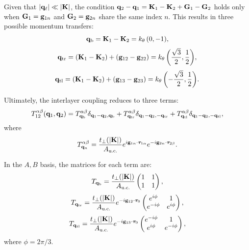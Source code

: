 Given that \( \abs{{\vb{q}}_\ell} \ll \abs{{\vb{K}}} \), the condition \( {\vb{q}}_2 - {\vb{q}}_1 = {\vb{K}}_1 - {\vb{K}}_2 + {\vb{G}}_1 - {\vb{G}}_2 \) holds only when \( {\vb{G}}_1 = {\vb{g}}_{1n} \) and \( {\vb{G}}_2 = {\vb{g}}_{2n} \) share the same index \( n \). This results in three possible momentum transfers:
\begin{equation} \label{eq:qb}
{\vb{q}}_\text{b} = {\vb{K}}_1 - {\vb{K}}_2 = k_\theta \, (0, -1),
\end{equation}
\begin{equation} \label{eq:qtr}
{\vb{q}}_\text{tr} = ({\vb{K}}_1 - {\vb{K}}_2) + ({\vb{g}}_{12} - {\vb{g}}_{22}) = k_\theta \, \qty(\frac{\sqrt{3}}{2}, \frac{1}{2}),
\end{equation}
\begin{equation} \label{eq:qtl}
{\vb{q}}_\text{tl} = ({\vb{K}}_1 - {\vb{K}}_2) + ({\vb{g}}_{13} - {\vb{g}}_{23}) = k_\theta \, \qty(-\frac{\sqrt{3}}{2}, \frac{1}{2}).
\end{equation}

Ultimately, the interlayer coupling reduces to three terms:
\begin{equation} \label{eq:interlayer-3terms}
T_{12}^{\alpha\beta}({\vb{q}}_1, {\vb{q}}_2) = T^{\alpha\beta}_{{\vb{q}}_\text{b}} \delta_{{\vb{q}}_1 - {\vb{q}}_2, {\vb{q}}_\text{b}}
+ T^{\alpha\beta}_{{\vb{q}}_\text{tr}} \delta_{{\vb{q}}_1 - {\vb{q}}_2, -{\vb{q}}_\text{tr}}
+ T^{\alpha\beta}_{{\vb{q}}_\text{tl}} \delta_{{\vb{q}}_1 - {\vb{q}}_2, -{\vb{q}}_\text{tl}},
\end{equation}
where
\begin{equation} \label{eq:interlayer-tensor}
T^{\alpha\beta}_{{\vb{q}}_n} = \frac{t_\perp(\abs{{\vb{K}}})}{A_{\text{u.c.}}} e^{i {\vb{g}}_{1n} \cdot \bm{\tau}_{1\alpha}}
e^{-i {\vb{g}}_{2n} \cdot \bm{\tau}_{2\beta}}.
\end{equation}

In the \( A, B \) basis, the matrices for each term are:
\begin{equation} \label{eq:T-qb}
T_{{\vb{q}}_\text{b}} = \frac{t_\perp(\abs{{\vb{K}}})}{A_{\text{u.c.}}}
\begin{pmatrix}
1 & 1 \\
1 & 1
\end{pmatrix},
\end{equation}
\begin{equation} \label{eq:T-qtr}
T_{{\vb{q}}_\text{tr}} = \frac{t_\perp(\abs{{\vb{K}}})}{A_{\text{u.c.}}} e^{-i {\vb{g}}_{12} \cdot \bm{\tau}_0}
\begin{pmatrix}
e^{i\phi} & 1 \\
e^{-i\phi} & e^{i\phi}
\end{pmatrix},
\end{equation}
\begin{equation} \label{eq:T-qtl}
T_{{\vb{q}}_\text{tl}} = \frac{t_\perp(\abs{{\vb{K}}})}{A_{\text{u.c.}}} e^{-i {\vb{g}}_{13} \cdot \bm{\tau}_0}
\begin{pmatrix}
e^{-i\phi} & 1 \\
e^{i\phi} & e^{-i\phi}
\end{pmatrix},
\end{equation}
where \( \phi = 2\pi/3 \).


